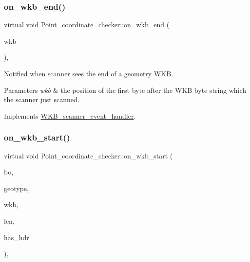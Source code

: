 \subsubsection{\texorpdfstring{on\+\_\+wkb\+\_\+end()}{on\_wkb\_end()}}
{\footnotesize\ttfamily virtual void Point\+\_\+coordinate\+\_\+checker\+::on\+\_\+wkb\+\_\+end (\begin{DoxyParamCaption}\item[{const void $\ast$}]{wkb }\end{DoxyParamCaption})\hspace{0.3cm}{\ttfamily [inline]}, {\ttfamily [virtual]}}

Notified when scanner sees the end of a geometry W\+KB. 
\begin{DoxyParams}{Parameters}
{\em wkb} & the position of the first byte after the W\+KB byte string which the scanner just scanned. \\
\hline
\end{DoxyParams}


Implements \mbox{\hyperlink{classWKB__scanner__event__handler_a07c27cceefdd31f25f1d0b3754786b78}{W\+K\+B\+\_\+scanner\+\_\+event\+\_\+handler}}.

\mbox{\label{classPoint__coordinate__checker_a69fe70028bc0356ba1e10d47a7a76e8e}} 
\subsubsection{\texorpdfstring{on\+\_\+wkb\+\_\+start()}{on\_wkb\_start()}}
{\footnotesize\ttfamily virtual void Point\+\_\+coordinate\+\_\+checker\+::on\+\_\+wkb\+\_\+start (\begin{DoxyParamCaption}\item[{Geometry\+::wkb\+Byte\+Order}]{bo,  }\item[{Geometry\+::wkb\+Type}]{geotype,  }\item[{const void $\ast$}]{wkb,  }\item[{uint32}]{len,  }\item[{bool}]{has\+\_\+hdr }\end{DoxyParamCaption})\hspace{0.3cm}{\ttfamily [inline]}, {\ttfamily [virtual]}}

